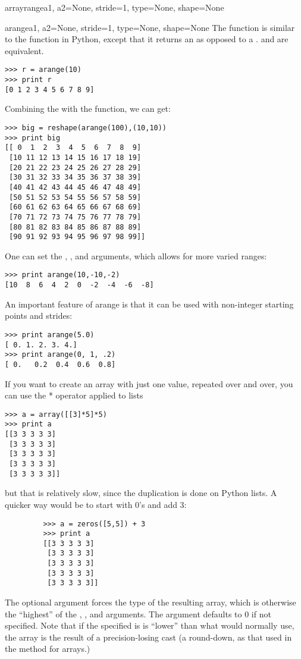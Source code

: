 \begin{funcdesc}{arrayrange}{a1, a2=None, stride=1, type=None, shape=None}
\end{funcdesc}
\begin{funcdesc}{arange}{a1, a2=None, stride=1, type=None, shape=None}
   The  function is similar to the  function
   in Python, except that it returns an  as opposed to a
   .
    and  are equivalent.
\begin{verbatim}
>>> r = arange(10)
>>> print r
[0 1 2 3 4 5 6 7 8 9]
\end{verbatim}
   Combining the  with the  function, we can
   get:
\begin{verbatim}
>>> big = reshape(arange(100),(10,10))
>>> print big
[[ 0  1  2  3  4  5  6  7  8  9]
 [10 11 12 13 14 15 16 17 18 19]
 [20 21 22 23 24 25 26 27 28 29]
 [30 31 32 33 34 35 36 37 38 39]
 [40 41 42 43 44 45 46 47 48 49]
 [50 51 52 53 54 55 56 57 58 59]
 [60 61 62 63 64 65 66 67 68 69]
 [70 71 72 73 74 75 76 77 78 79]
 [80 81 82 83 84 85 86 87 88 89]
 [90 91 92 93 94 95 96 97 98 99]]
\end{verbatim}
   One can set the , , and  arguments, which 
   allows for more varied ranges:
\begin{verbatim}
>>> print arange(10,-10,-2)
[10  8  6  4  2  0  -2  -4  -6  -8]
\end{verbatim}
   An important feature of arange is that it can be used with non-integer
   starting points and strides:
\begin{verbatim}
>>> print arange(5.0)
[ 0. 1. 2. 3. 4.]
>>> print arange(0, 1, .2)
[ 0.   0.2  0.4  0.6  0.8]
\end{verbatim}
   If you want to create an array with just one value, repeated over and over,
   you can use the * operator applied to lists
\begin{verbatim}
>>> a = array([[3]*5]*5)
>>> print a
[[3 3 3 3 3]
 [3 3 3 3 3]
 [3 3 3 3 3]
 [3 3 3 3 3]
 [3 3 3 3 3]]
\end{verbatim}
   but that is relatively slow, since the duplication is done on Python lists.
   A quicker way would be to start with 0's and add 3:
\begin{verbatim}
         >>> a = zeros([5,5]) + 3
         >>> print a
         [[3 3 3 3 3]
          [3 3 3 3 3]
          [3 3 3 3 3]
          [3 3 3 3 3]
          [3 3 3 3 3]]
\end{verbatim}
   The optional  argument forces the type of the resulting array,
   which is otherwise the ``highest'' of the , , and 
    arguments.  The  argument defaults to 0 if not 
   specified. Note that if the specified  is
   is ``lower'' than what  would
   normally use, the array is the result of a precision-losing cast (a
   round-down, as that used in the  method for arrays.)
\end{funcdesc}


